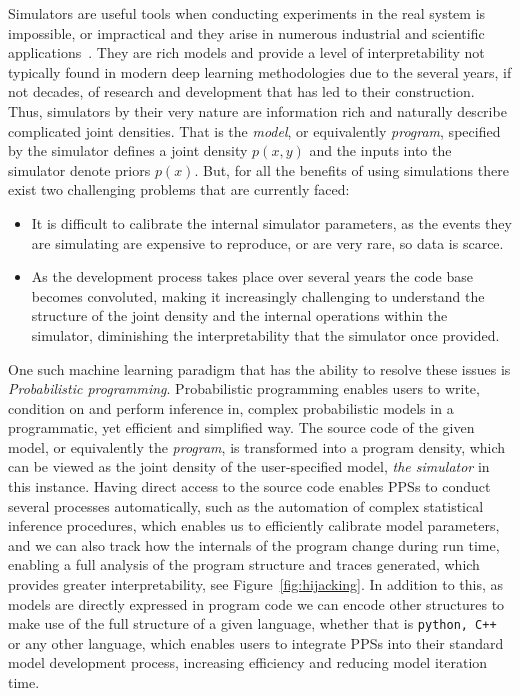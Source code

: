 \documentclass{article}
\begin{document}


Simulators are useful tools when conducting experiments in the real system 
is impossible, or impractical and they arise in numerous industrial \cite{di2015simulator,judd2009numerically,kass1990rapid} and scientific applications~\cite{smith2008towards,bershteyn2018implementation,gleisberg_event_2008}. 
They are rich models and provide a level of interpretability not typically found in modern deep learning methodologies due to the several years, if not decades, of research and development that has led to their construction.
Thus, simulators by their very nature are information rich and naturally describe complicated joint densities.
That is the \emph{model}, or equivalently \emph{program}, specified by the simulator defines a joint density $p(x,y)$ and the inputs into the simulator denote priors $p(x)$. 
But, for all the benefits of using simulations there exist two challenging problems that are currently faced:
\begin{itemize}
\item It is difficult to calibrate the internal simulator parameters, as the events they are simulating are expensive to reproduce, or are very rare, so data is scarce. 
\item As the development process takes place over several years the code base becomes convoluted, making it increasingly challenging to understand the structure of the joint density and the internal operations within the simulator, diminishing the interpretability that the simulator once provided. 
\end{itemize}

One such machine learning paradigm that has the ability to resolve these issues is \emph{Probabilistic programming}\cite{gordon2014probabilistic,milch2005blog,van2018introduction,tran2017deep}. 
Probabilistic programming enables users to write, condition on and perform inference in, complex probabilistic models in a programmatic, yet efficient and simplified way. 
The source code of the given model, or equivalently the \emph{program}, is transformed into a program density, which can
be viewed as the joint density of the user-specified model, \emph{the simulator} in this instance.
Having direct access to the source code enables PPSs to conduct several processes automatically, such as 
the automation of complex statistical inference procedures\cite{zhou2019lf,goodman2012church,wood2014new,rainforth2017automating}, which enables us to efficiently calibrate
model parameters, and we can also track how the internals of the program change during
run time, enabling a full analysis of the program structure and traces generated\cite{milch2005blog}, which provides greater interpretability, see Figure~\ref{fig:hijacking}.
In addition to this, as models are directly expressed in program code we can encode other structures to make use of the full structure of a given language, whether that is \texttt{python, C++} or 
any other language,
which enables users to integrate PPSs into their standard model development process, increasing efficiency and reducing model iteration time.
\end{document}
